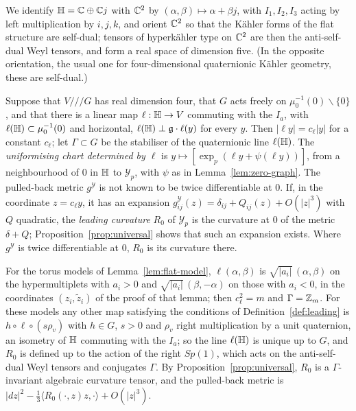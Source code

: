 We identify $\mathbb H=\mathbb C\oplus\mathbb C j$ with $\mathbb C^2$ by $(\alpha,\beta)\mapsto\alpha+\beta j$, with $I_1,I_2,I_3$
acting by left multiplication by $i,j,k$, and orient $\mathbb C^2$ so that the K\"ahler forms of the flat structure
are self-dual; tensors of hyperk\"ahler type on $\mathbb C^2$ are then the anti-self-dual Weyl tensors, and form a
real space of dimension five. (In the opposite orientation, the usual one for four-dimensional
quaternionic K\"ahler geometry, these are self-dual.)

\begin{definition}\label{def:leading}
Suppose that $V/\!/\!/G$ has real dimension four, that $G$ acts freely on $\mu_0^{-1}(0)\smallsetminus\{0\}$,
and that there is a linear map $\ell:\mathbb H\to V$ commuting with the $I_a$, with $\ell(\mathbb H)\subset\mu_0^{-1}(0)$
and horizontal, $\ell(\mathbb H)\perp\mathfrak g\cdot\ell(y)$ for every $y$. Then $|\ell y|=c_\ell|y|$ for a constant $c_\ell$; let
$\Gamma\subset G$ be the stabiliser of the quaternionic line $\ell(\mathbb H)$. The \emph{uniformising chart
determined by $\ell$} is $y\mapsto[\exp_p(\ell y+\psi(\ell y))]$, from a neighbourhood of $0$ in $\mathbb H$ to
$\mathcal Y_p$, with $\psi$ as in Lemma~\ref{lem:zero-graph}. The pulled-back metric $g^{\mathcal Y}$ is not known to be twice
differentiable at $0$. If, in the coordinate $z=c_\ell y$, it has an expansion
$g^{\mathcal Y}_{ij}(z)=\delta_{ij}+Q_{ij}(z)+O(|z|^3)$ with $Q$ quadratic, the \emph{leading curvature} $R_0$ of
$\mathcal Y_p$ is the curvature at $0$ of the metric $\delta+Q$; Proposition~\ref{prop:universal} shows that
such an expansion exists. Where $g^{\mathcal Y}$ is twice differentiable at $0$, $R_0$ is its curvature there.
\end{definition}

For the torus models of Lemma~\ref{lem:flat-model}, $\ell(\alpha,\beta)$ is $\sqrt{|a_i|}\,(\alpha,\beta)$ on the
hypermultiplets with $a_i>0$ and $\sqrt{|a_i|}\,(\beta,-\alpha)$ on those with $a_i<0$, in the coordinates
$(z_i,\tilde z_i)$ of the proof of that lemma; then $c_\ell^2=m$ and $\Gamma=\mathbb Z_m$. For these models any other map satisfying the conditions of Definition~\ref{def:leading} is
$h\circ\ell\circ(s\rho_v)$ with $h\in G$, $s>0$ and $\rho_v$ right multiplication by a unit quaternion, an
isometry of $\mathbb H$ commuting with the $I_a$; so the line $\ell(\mathbb H)$ is unique up to $G$, and $R_0$ is defined
up to the action of the right $Sp(1)$, which acts on the anti-self-dual Weyl tensors and conjugates $\Gamma$. By Proposition~\ref{prop:universal}, $R_0$ is a $\Gamma$-invariant
algebraic curvature tensor, and the pulled-back metric is $|dz|^2-\tfrac13\langle R_0(\cdot,z)z,\cdot\rangle
+O(|z|^3)$.

